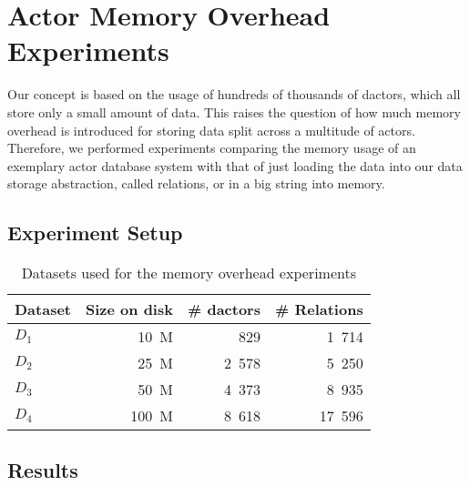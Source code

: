 
\section{Actor Memory Overhead Experiments}\label{sec:experiments}

  Our concept is based on the usage of hundreds of thousands of \glspl{dactor}, which all store only a small amount of data.
  This raises the question of how much memory overhead is introduced for storing data split across a multitude of actors.
  Therefore, we performed experiments comparing the memory usage of an exemplary actor database system with that of just loading the data into our data storage abstraction, called relations, or in a big string into memory.

\subsection{Experiment Setup}

  \begin{table}
    \centering
    \begin{tabular}{lrrr}
      \toprule
      \textbf{Dataset} & \textbf{Size on disk} & \textbf{\# \glspl{dactor}} & \textbf{\# Relations}\\
      \midrule
      $D_1$ & 10~M & 829 & 1~714 \\
      $D_2$ & 25~M & 2~578 & 5~250 \\
      $D_3$ & 50~M & 4~373 & 8~935 \\
      $D_4$ & 100~M & 8~618 & 17~596 \\
      \bottomrule
    \end{tabular}
    \caption{Datasets used for the memory overhead experiments}
    \label{tab:datasets}
  \end{table}

\subsection{Results}

